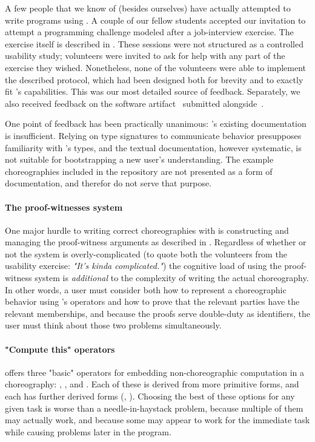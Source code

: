 A few people that we know of (besides ourselves) have actually attempted to write programs using \MultiChor.
A couple of our fellow students accepted our invitation to attempt a programming challenge modeled after a job-interview exercise.
The exercise itself is described in .
These sessions were not structured as a controlled usability study;
volunteers were invited to ask for help with any part of the exercise they wished.
Nonetheless, none of the volunteers were able to implement the described protocol,
which had been designed both for brevity and to exactly fit \MultiChor's capabilities.
This was our most detailed source of feedback.
Separately, 
we also received feedback on the software artifact~\cite{ourArtifact} submitted alongside~\cite{batesenclaves}.

One point of feedback has been practically unanimous:
\MultiChor's existing documentation is insufficient.
Relying on type signatures to communicate behavior presupposes familiarity with \MultiChor's types,
and the textual documentation, however systematic, is not suitable for bootstrapping a new user's understanding.
The example choreographies included in the \MultiChor repository are not presented as a form of documentation, 
and therefor do not serve that purpose.

\paragraph{The proof-witnesses system}
One major hurdle to writing correct choreographies with \MultiChor is constructing and managing the proof-witness arguments
as described in .
Regardless of whether or not the system is overly-complicated
(to quote both the volunteers from the usability exercise:
\emph{"It's kinda complicated."})
the cognitive load of using the proof-witness system is \emph{additional} to
the complexity of writing the actual choreography.
In other words,
a user must consider both how to represent a choreographic behavior using \MultiChor's operators
and how to prove that the relevant parties have the relevant memberships,
and because the proofs serve double-duty as identifiers, the user must think about those two problems simultaneously.

\paragraph{"Compute this" operators}
\MultiChor offers three "basic" operators for embedding non-choreographic computation in a choreography:
, , and .
Each of these is derived from more primitive forms, and each has further derived forms
(\eg {}, ).
Choosing the best of these options for any given task is worse than a needle-in-haystack problem,
because multiple of them may actually work,
and because some may appear to work for the immediate task while causing problems later in the program.


